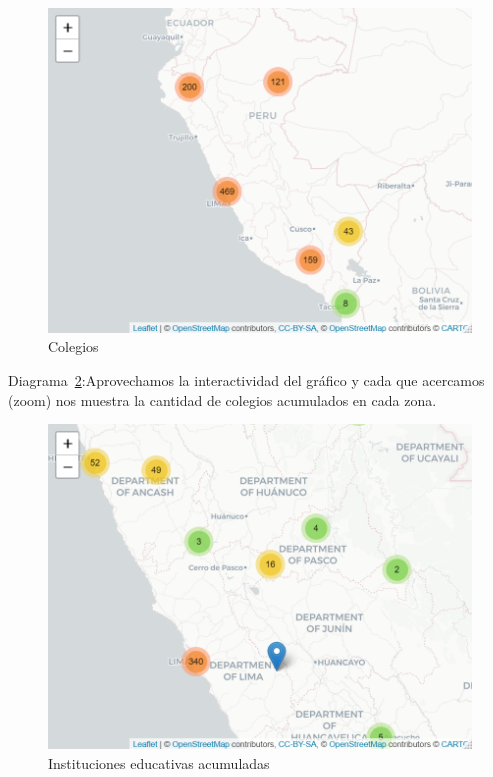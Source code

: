 \begin{figure}[th]
\centering
\includegraphics[width=1\textwidth]{Figures/mapa2}
\decoRule
\caption[Mapa]{Colegios}
\label{fig:mapa2}
\end{figure}

Diagrama~\ref{fig:mapa3}:Aprovechamos la interactividad del gráfico y cada que acercamos (zoom) nos muestra la cantidad de colegios acumulados en cada zona.

\begin{figure}[th]
\centering
\includegraphics[width=1\textwidth]{Figures/mapa3}
\decoRule
\caption[Mapa]{Instituciones educativas acumuladas}
\label{fig:mapa3}
\end{figure}